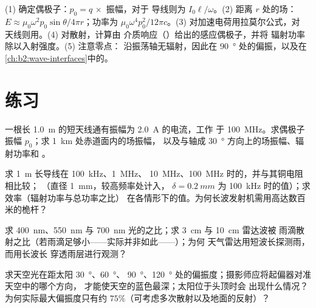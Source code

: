\begin{method}[辐射估算]\label{met:b2:dipole-radiation:method}
(1) 确定偶极子：$p_0 = q\,\times$ 振幅，对于
导线则为 $I_0\ell/\omega$。(2) 距离 $r$ 处的场：$E \approx \mu_0\omega^2p_0\sin\theta/4\pi r$；功率为
$\mu_0\omega^4p_0^2/12\pi c$。(3) 对加速电荷用拉莫尔公式，对
天线则用。(4) 对散射，计算由
介质响应（）给出的感应偶极子，并将
辐射功率除以入射强度。(5) 注意零点：
沿振荡轴无辐射，因此在
\qty{90}{\degree} 处的偏振，以及在\cref{ch:b2:wave-interfaces}中的。
\end{method}

\section{练习}

\begin{exercise}[$\star$]\label{exo:b2:dipole-radiation:1}
一根长 \qty{1.0}{m} 的短天线通有振幅为 \qty{2.0}{A} 的电流，工作
于 \qty{100}{MHz}。求偶极子振幅 $p_0$；求 \qty{1}{km} 处赤道面内的场振幅，
以及与轴成 \qty{30}{\degree} 方向上的场振幅、辐射功率和
。
\end{exercise}

\begin{exercise}[$\star$]\label{exo:b2:dipole-radiation:2}
求 \qty{1}{m} 长导线在 \qty{100}{kHz}、\qty{1}{MHz}、
\qty{10}{MHz}、\qty{100}{MHz} 时的，并与其铜电阻相比较；
（直径 \qty{1}{mm}，较高频率处计入，
$\delta = \qty{0.2}{mm}$ 为 \qty{100}{kHz} 时的值）；求效率（辐射功率与总功率之比）
在各情形下的值。为何长波发射机需用高达数百
米的桅杆？
\end{exercise}

\begin{exercise}[$\star$]\label{exo:b2:dipole-radiation:3}
求 \qty{400}{nm}、\qty{550}{nm} 与
\qty{700}{nm} 光的之比；求 \qty{3}{cm} 与 \qty{10}{cm} 雷达波被
雨滴散射之比（若雨滴足够小——实际并非如此——）；为何
天气雷达用短波长探测雨，而用长波长
穿透雨层进行观测？
\end{exercise}

\begin{exercise}[$\star$]\label{exo:b2:dipole-radiation:4}
求天空光在距太阳 \qty{30}{\degree}、\qty{60}{\degree}、
\qty{90}{\degree}、\qty{120}{\degree} 处的偏振度；摄影师应将起偏器对准天空中的哪个方向，
才能使天空的蓝色最深；太阳位于头顶时会
出现什么情况？为何实际最大偏振度只有约
$75\%$（可考虑多次散射以及地面的反射）？
\end{exercise}

